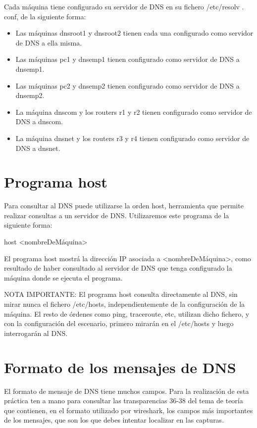 \documentclass[12pt, a4paper]{report}
\begin{document}
Cada máquina tiene configurado su servidor de DNS en su fichero /etc/resolv . conf, de la siguiente forma:

\begin{itemize}
  \item Las máquinas dnsroot1 y dnsroot2 tienen cada una configurado como servidor de DNS a ella misma.

  \item Las máquinas pc1 y dnsemp1 tienen configurado como servidor de DNS a dnsemp1.

  \item Las máquinas pc2 y dnsemp2 tienen configurado como servidor de DNS a dnsemp2.

  \item La máquina dnscom y los routers r1 y r2 tienen configurado como servidor de DNS a dnscom.

  \item La máquina dnsnet y los routers r3 y r4 tienen configurado como servidor de DNS a dnsnet.

\end{itemize}

\chapter{Programa host}
Para consultar al DNS puede utilizarse la orden host, herramienta que permite realizar consultas a un servidor de DNS. Utilizaremos este programa de la siguiente forma:

host <nombreDeMáquina>

El programa host mostrá la dirección IP asociada a <nombreDeMáquina>, como resultado de haber consultado al servidor de DNS que tenga configurado la máquina donde se ejecuta el programa.

NOTA IMPORTANTE: El programa host consulta directamente al DNS, sin mirar nunca el fichero /etc/hosts, independientemente de la configuración de la máquina. El resto de órdenes como ping, traceroute, etc, utilizan dicho fichero, y con la configuración del escenario, primero mirarán en el /etc/hosts y luego interrogarán al DNS.

\chapter{Formato de los mensajes de DNS}
El formato de mensaje de DNS tiene muchos campos. Para la realización de esta práctica ten a mano para consultar las transparencias 36-38 del tema de teoría que contienen, en el formato utilizado por wireshark, los campos más importantes de los mensajes, que son los que debes intentar localizar en las capturas.
\end{document}
